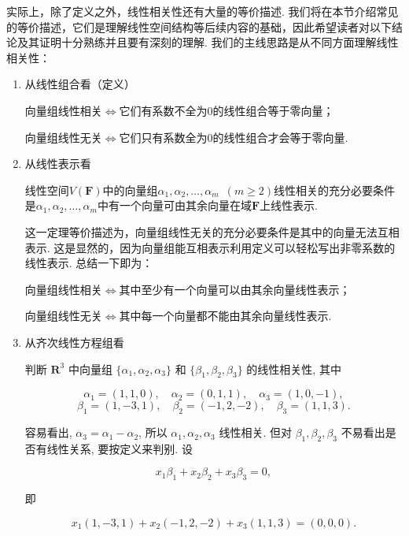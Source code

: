 实际上，除了定义之外，线性相关性还有大量的等价描述. 我们将在本节介绍常见的等价描述，它们是理解线性空间结构等后续内容的基础，因此希望读者对以下结论及其证明十分熟练并且要有深刻的理解. 我们的主线思路是从不同方面理解线性相关性：
\begin{enumerate}
    \item 从线性组合看（定义）

          向量组线性相关$\iff$它们有系数不全为0的线性组合等于零向量；

          向量组线性无关$\iff$它们只有系数全为0的线性组合才会等于零向量.

    \item 从线性表示看
          \begin{theorem}{}{}
              线性空间$V(\mathbf{F})$中的向量组$\alpha_1,\alpha_2,\ldots,\alpha_m\enspace(m \geqslant 2)$线性相关的充分必要条件是$\alpha_1,\alpha_2,\ldots,\alpha_m$中有一个向量可由其余向量在域$\mathbf{F}$上线性表示.
          \end{theorem}
          这一定理等价描述为，向量组线性无关的充分必要条件是其中的向量无法互相表示. 这是显然的，因为向量组能互相表示利用定义可以轻松写出非零系数的线性表示. 总结一下即为：

          向量组线性相关$\iff$其中至少有一个向量可以由其余向量线性表示；

          向量组线性无关$\iff$其中每一个向量都不能由其余向量线性表示.

    \item 从齐次线性方程组看
          \begin{example}{}{}
           判断 $\mathbf{R}^3$ 中向量组 $\{\alpha_1, \alpha_2, \alpha_3\}$ 和 $\{\beta_1, \beta_2, \beta_3\}$ 的线性相关性, 其中

            \[
            \alpha_1 = (1, 1, 0), \quad \alpha_2 = (0, 1, 1), \quad \alpha_3 = (1, 0, -1),
            \]
            \[
            \beta_1 = (1, -3, 1), \quad \beta_2 = (-1, 2, -2), \quad \beta_3 = (1, 1, 3).
            \]
          \end{example}
          \begin{solution}
           容易看出, $\alpha_3 = \alpha_1 - \alpha_2$, 所以 $\alpha_1, \alpha_2, \alpha_3$ 线性相关. 但对 $\beta_1, \beta_2, \beta_3$ 不易看出是否有线性关系, 要按定义来判别. 设

            \[
            x_1 \beta_1 + x_2 \beta_2 + x_3 \beta_3 = 0, \tag{1}
            \]

            即

            \[
            x_1(1, -3, 1) + x_2(-1, 2, -2) + x_3(1, 1, 3) = (0, 0, 0).
            \]


\end{solution}
\end{enumerate}
